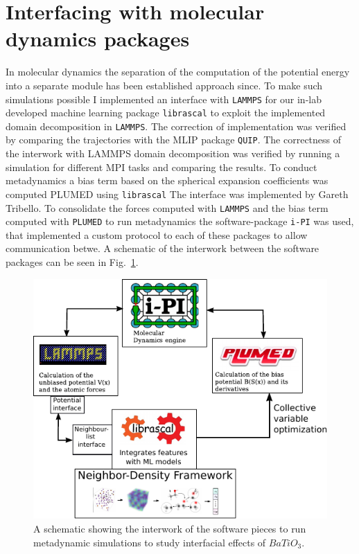 \section{Interfacing with molecular dynamics packages}
In molecular dynamics the separation of the computation of the potential energy into a separate module has been established approach since\cite{TODOLAMMPSv1GROMACSv1}.
To make such simulations possible I implemented an interface with \texttt{LAMMPS} for our in-lab developed machine learning package \texttt{librascal} to exploit the implemented domain decomposition in \texttt{LAMMPS}.
The correction of implementation was verified by comparing the trajectories with the MLIP package \texttt{QUIP}.
The correctness of the interwork with LAMMPS domain decomposition was verified by running a simulation for different MPI tasks and comparing the results.
To conduct metadynamics a bias term based on the spherical expansion coefficients was computed PLUMED using \texttt{librascal}
The interface was implemented by Gareth Tribello.
To consolidate the forces computed with \texttt{LAMMPS} and the bias term computed with \texttt{PLUMED} to run metadynamics the software-package \texttt{i-PI} was used, that implemented a custom protocol to each of these packages to allow communication betwe.
A schematic of the interwork between the software packages can be seen in Fig.~\ref{fig:ipi-librascal-plumed}.
\begin{figure}
    \includegraphics[width=\textwidth]{fig/ipi-librascal-plumed.pdf}
    \caption{A schematic showing the interwork of the software pieces to run metadynamic simulations to study interfacial effects of $BaTiO_3$.}
    \label{fig:ipi-librascal-plumed}
\end{figure}

